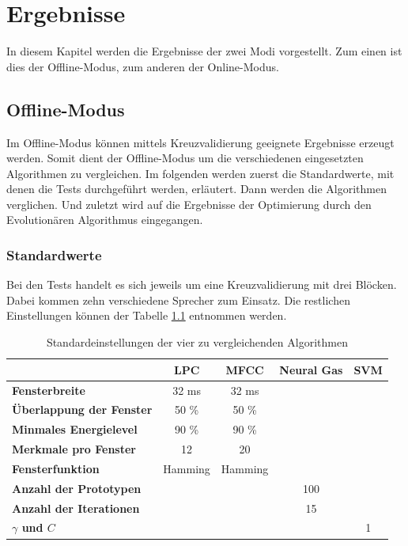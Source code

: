\chapter{Ergebnisse}
\label{cha:ergebnisse}
In diesem Kapitel werden die Ergebnisse der zwei Modi vorgestellt. Zum einen ist dies der Offline-Modus, zum anderen der Online-Modus. 

\section{Offline-Modus}
Im Offline-Modus können mittels Kreuzvalidierung geeignete Ergebnisse erzeugt werden. Somit dient der Offline-Modus um die verschiedenen eingesetzten Algorithmen zu vergleichen. Im folgenden werden zuerst die Standardwerte, mit denen die Tests durchgeführt werden, erläutert. Dann werden die Algorithmen verglichen. Und zuletzt wird auf die Ergebnisse der Optimierung durch den Evolutionären Algorithmus eingegangen.

\subsection{Standardwerte}
Bei den Tests handelt es sich jeweils um eine Kreuzvalidierung mit drei Blöcken. Dabei kommen zehn verschiedene Sprecher zum Einsatz. Die restlichen Einstellungen können der Tabelle \ref{tbl:standardwerte} entnommen werden.

\setlength{\tabcolsep}{10pt} %
\renewcommand{\arraystretch}{1.25} %

\begin{table}[h]
	\centering
	\begin{tabular}{l|c|c|c|c}			
		& \textbf{LPC} & \textbf{MFCC} & \textbf{Neural Gas} & \textbf{SVM} \\
		\hline
		\textbf{Fensterbreite} & 32 ms & 32 ms & & \\
		\textbf{Überlappung der Fenster} & 50 \% & 50 \% & & \\
		\textbf{Minmales Energielevel} & 90 \% & 90 \% & & \\
		\textbf{Merkmale pro Fenster} & 12 & 20 & & \\
		\textbf{Fensterfunktion} & Hamming & Hamming & & \\
		\textbf{Anzahl der Prototypen} & & & 100 & \\
		\textbf{Anzahl der Iterationen} & & & 15 & \\
		\textbf{$\gamma$ und $C$} & & & & 1 \\
	\end{tabular}
	\caption{Standardeinstellungen der vier zu vergleichenden Algorithmen}
	\label{tbl:standardwerte}
\end{table}

